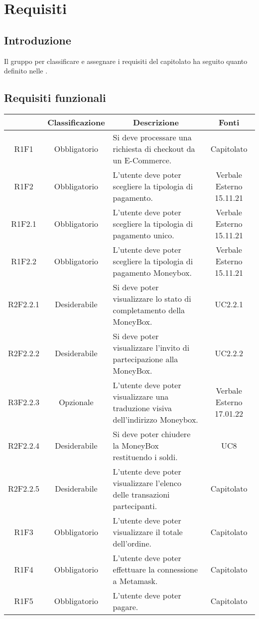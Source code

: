 \section{Requisiti} \label{section:requisiti}

\subsection{Introduzione}
Il gruppo \groupName{} per classificare e assegnare i requisiti del capitolato ha seguito quanto definito nelle \docNameVersionNdP{}.

\subsection{Requisiti funzionali} \label{subsection:requisiti_funzionali}
\begin{table}[H]
    \centering
    \renewcommand{\arraystretch}{1.8}
    \begin{tabular}{c | c | p{6cm} | c}
        \rowcolor[HTML]{125E28}
        \multicolumn{1}{c}{\color[HTML]{FFFFFF} \textbf{Codice}} & 
		\multicolumn{1}{c}{\color[HTML]{FFFFFF} \textbf{Classificazione}} & 
		\multicolumn{1}{c}{\color[HTML]{FFFFFF} \textbf{Descrizione}} & 
		\multicolumn{1}{c}{\color[HTML]{FFFFFF} \textbf{Fonti}} \\
        \hline
        R1F1 & Obbligatorio & Si deve processare una richiesta di checkout da un E-Commerce. & Capitolato \\
        R1F2 & Obbligatorio & L'utente deve poter scegliere la tipologia di pagamento. & Verbale Esterno 15.11.21 \\
        R1F2.1 & Obbligatorio & L'utente deve poter scegliere la tipologia di pagamento unico. & Verbale Esterno 15.11.21\\
        R1F2.2 & Obbligatorio & L'utente deve poter scegliere la tipologia di pagamento Moneybox. & Verbale Esterno 15.11.21\\
        R2F2.2.1 & Desiderabile & Si deve poter visualizzare lo stato di completamento della MoneyBox. & UC2.2.1 \\
        R2F2.2.2 & Desiderabile & Si deve poter visualizzare l'invito di partecipazione alla MoneyBox. & UC2.2.2 \\
        R3F2.2.3 & Opzionale & L'utente deve poter visualizzare una traduzione visiva dell'indirizzo Moneybox. & Verbale Esterno 17.01.22 \\
        R2F2.2.4 & Desiderabile & Si deve poter chiudere la MoneyBox restituendo i soldi. & UC8 \\
        R2F2.2.5 & Desiderabile & L'utente deve poter visualizzare l'elenco delle transazioni partecipanti. & Capitolato \\
        R1F3 & Obbligatorio & L'utente deve poter visualizzare il totale dell'ordine. & Capitolato \\
        R1F4 & Obbligatorio & L'utente deve poter effettuare la connessione a Metamask. & Capitolato \\
        R1F5 & Obbligatorio & L'utente deve poter pagare. & Capitolato \\
    \end{tabular}
\end{table}
